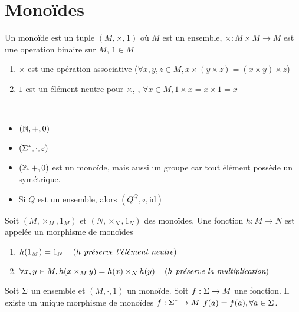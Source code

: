\section{Monoïdes}

\begin{definition}[Monoïde]
	Un monoïde est un tuple $(M, \times, 1)$ où $M$ est un ensemble, $\times : M \times M \to M$ est une operation binaire sur $M$,
	$1\in M$ \tq
	\begin{enumerate}
		\item $\times$ est une opération  associative ($\forall x,y,z \in M , x \times (y \times z) = (x \times y) \times z$)
		\item $1$ est un élément neutre pour $\times$, \cad, $\forall x \in M, 1 \times x = x \times 1 = x$
	\end{enumerate}
\end{definition}

\begin{exemple}
    \ \newline
	\begin{itemize}
		\item $(\mathbb{N}, +, 0)$
		\item $(\Sigma^{*}, \cdot, \varepsilon)$
		\item $(\mathbb{Z}, +, 0)$ est un monoïde, mais aussi un groupe car tout élément possède un symétrique.
		\item Si $Q$ est un ensemble, alors $(Q ^ Q, \circ, \text{id})$
	\end{itemize}
\end{exemple}


\begin{definition}
	Soit $(M,\times_M, 1_M)$ et $(N,\times_N, 1_N)$ des monoïdes. Une fonction $h :  M \to N$ est appelée un morphisme de monoïdes \ssi
	\begin{enumerate}
		\item $h(1_M) = 1_N \quad\left(\textit{$h$ préserve l'élément neutre}\right)$
		\item $\forall x, y \in M, h (x \times_M y) = h(x) \times_N h(y) \quad\left(\textit{$h$ préserve la multiplication}\right)$
	\end{enumerate}
\end{definition}


\begin{prop}
	Soit $\Sigma$ un ensemble et $(M,\cdot, 1)$ un monoïde. Soit $f : \Sigma \to M$ une fonction. Il existe
	un unique morphisme de monoïdes $\bar f : \Sigma^{*} \to M$ \tq $\bar f (a) =  f (a),  \forall a \in \Sigma$.

\end{prop}


